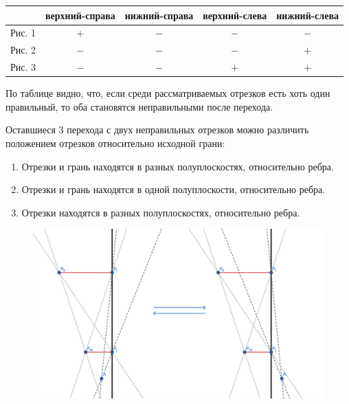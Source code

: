 \documentclass[letterpaper,12pt]{article}
\begin{document}
\begin{enumerate}
            \begin{center}
                  \begin{tabular}{| c | c | c | c | c |}
                        \hline
                        & верхний-справа & нижний-справа & 
                        верхний-слева & нижний-слева \\
                        \hline
                        Рис. 1 & $+$ & $-$ & $-$ & $-$ \\
                        \hline
                        Рис. 2 & $-$ & $-$ & $-$ & $+$ \\
                        \hline
                        Рис. 3 & $-$ & $-$ & $+$ & $+$ \\
                        \hline
                  \end{tabular}
            \end{center}
            
            По таблице видно, что, если среди рассматриваемых отрезков есть
            хоть один правильный, то оба становятся неправильными после 
            перехода. 
            
            Оставшиеся 3 перехода с двух неправильных отрезков
            можно различить положением отрезков относительно исходной грани:
            \begin{enumerate}
                  \item Отрезки и грань находятся в разных полуплоскостях,
                        относительно ребра.
                  \item Отрезки и грань находятся в одной полуплоскости,
                        относительно ребра.
                  \item Отрезки находятся в разных полуплоскостях,
                        относительно ребра.
            \end{enumerate}
            
            \begin{figure}[H]
                  \centering
                  \includegraphics[width=.6\linewidth]{one_side_1.png}
            \end{figure}


\end{enumerate}
\end{document}

